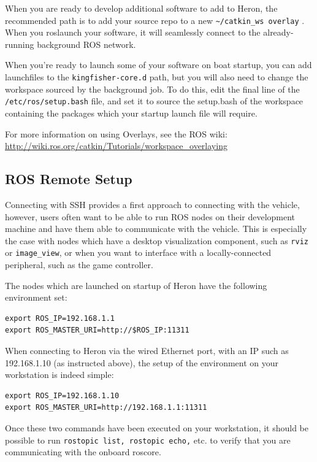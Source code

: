 \documentclass[]{clearpath-latex/clearpath-manual}
\begin{document}
When you are ready to develop additional software to add to Heron, the recommended path is to add your source repo to a new \lstinline{~/catkin_ws overlay} . When you roslaunch your software, it will seamlessly connect to the already-running background ROS network.

When you’re ready to launch some of your software on boat startup, you can add launchfiles to the \lstinline{kingfisher-core.d} path, but you will also need to change the workspace sourced by the background job. To do this, edit the final line of the \lstinline{/etc/ros/setup.bash} file, and set it to source the setup.bash of the workspace containing the packages which your startup launch file will require.

For more information on using Overlays, see the ROS wiki: \url{http://wiki.ros.org/catkin/Tutorials/workspace_overlaying}

\subsection{ROS Remote Setup}
Connecting with SSH provides a first approach to connecting with the vehicle, however, users often want to be able to run ROS nodes on their development machine and have them able to communicate with the vehicle. This is especially the case with nodes which have a desktop visualization component, such as \lstinline{rviz} or \lstinline{image_view}, or when you want to interface with a locally-connected peripheral, such as the game controller.

The nodes which are launched on startup of Heron have the following environment set:

\begin{lstlisting}
export ROS_IP=192.168.1.1 
export ROS_MASTER_URI=http://$ROS_IP:11311
\end{lstlisting}

When connecting to Heron via the wired Ethernet port, with an IP such as 192.168.1.10 (as instructed above), the setup of the environment on your workstation is indeed simple:

\begin{lstlisting}
export ROS_IP=192.168.1.10 
export ROS_MASTER_URI=http://192.168.1.1:11311
\end{lstlisting}

Once these two commands have been executed on your workstation, it should be possible to run \lstinline{rostopic list, rostopic echo,} etc. to verify that you are communicating with the onboard roscore.
\end{document}

